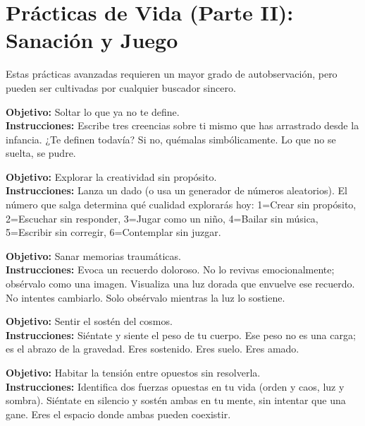 \documentclass[12pt,a4paper,openany]{book}
\begin{document}
\chapter{Prácticas de Vida (Parte II): Sanación y Juego}
\label{chap:practicas_II}

Estas prácticas avanzadas requieren un mayor grado de autobservación, pero pueden ser cultivadas por cualquier buscador sincero.


\begin{practica}[title={Práctica 7: La Quema de las Viejas Certezas}]
\textbf{Objetivo:} Soltar lo que ya no te define. \\
\textbf{Instrucciones:} Escribe tres creencias sobre ti mismo que has arrastrado desde la infancia. ¿Te definen todavía? Si no, quémalas simbólicamente. Lo que no se suelta, se pudre.
\end{practica}


\begin{practica}[title={Práctica 8: El Juego de los Dados}]
\textbf{Objetivo:} Explorar la creatividad sin propósito. \\
\textbf{Instrucciones:} Lanza un dado (o usa un generador de números aleatorios). El número que salga determina qué cualidad explorarás hoy: 1=Crear sin propósito, 2=Escuchar sin responder, 3=Jugar como un niño, 4=Bailar sin música, 5=Escribir sin corregir, 6=Contemplar sin juzgar.
\end{practica}


\begin{practica}[title={Práctica 9: La Sintonización del Recuerdo}]
\textbf{Objetivo:} Sanar memorias traumáticas. \\
\textbf{Instrucciones:} Evoca un recuerdo doloroso. No lo revivas emocionalmente; obsérvalo como una imagen. Visualiza una luz dorada que envuelve ese recuerdo. No intentes cambiarlo. Solo obsérvalo mientras la luz lo sostiene.
\end{practica}


\begin{practica}[title={Práctica 10: La Gravedad Empática}]
\textbf{Objetivo:} Sentir el sostén del cosmos. \\
\textbf{Instrucciones:} Siéntate y siente el peso de tu cuerpo. Ese peso no es una carga; es el abrazo de la gravedad. Eres sostenido. Eres suelo. Eres amado.
\end{practica}


\begin{practica}[title={Práctica 11: La Danza del Umbral}]
\textbf{Objetivo:} Habitar la tensión entre opuestos sin resolverla. \\
\textbf{Instrucciones:} Identifica dos fuerzas opuestas en tu vida (orden y caos, luz y sombra). Siéntate en silencio y sostén ambas en tu mente, sin intentar que una gane. Eres el espacio donde ambas pueden coexistir.
\end{practica}
\end{document}
